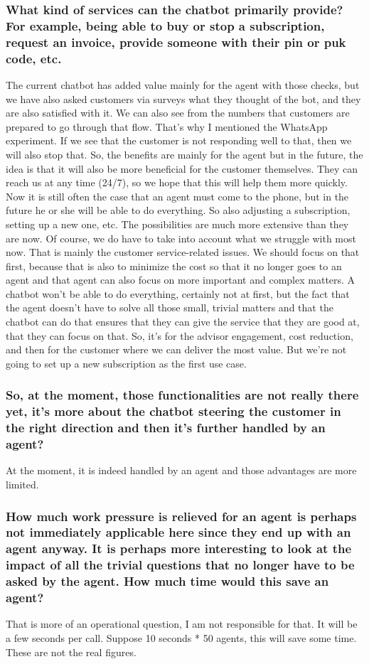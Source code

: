 \begin{appendices}
	\subsubsection{What kind of services can the chatbot primarily provide? For example, being able to buy or stop a subscription, request an invoice, provide someone with their \acrfull{pin} or \acrfull{puk} code, etc.}
	The current chatbot has added value mainly for the agent with those checks, but we have also asked customers via surveys what they thought of the bot, and they are also satisfied with it. We can also see from the numbers that customers are prepared to go through that flow. That's why I mentioned the WhatsApp experiment. If we see that the customer is not responding well to that, then we will also stop that. So, the benefits are mainly for the agent but in the future, the idea is that it will also be more beneficial for the customer themselves. They can reach us at any time (24/7), so we hope that this will help them more quickly. Now it is still often the case that an agent must come to the phone, but in the future he or she will be able to do everything. So also adjusting a subscription, setting up a new one, etc. The possibilities are much more extensive than they are now. Of course, we do have to take into account what we struggle with most now. That is mainly the customer service-related issues. We should focus on that first, because that is also to minimize the cost so that it no longer goes to an agent and that agent can also focus on more important and complex matters. A chatbot won't be able to do everything, certainly not at first, but the fact that the agent doesn't have to solve all those small, trivial matters and that the chatbot can do that ensures that they can give the service that they are good at, that they can focus on that. So, it's for the advisor engagement, cost reduction, and then for the customer where we can deliver the most value. But we're not going to set up a new subscription as the first use case.
	
	\subsubsection{So, at the moment, those functionalities are not really there yet, it's more about the chatbot steering the customer in the right direction and then it's further handled by an agent?}
	At the moment, it is indeed handled by an agent and those advantages are more limited.
	
	\subsubsection{How much work pressure is relieved for an agent is perhaps not immediately applicable here since they end up with an agent anyway. It is perhaps more interesting to look at the impact of all the trivial questions that no longer have to be asked by the agent. How much time would this save an agent?}
	That is more of an operational question, I am not responsible for that. It will be a few seconds per call. Suppose 10 seconds * 50 agents, this will save some time. These are not the real figures.
	

\end{appendices}
